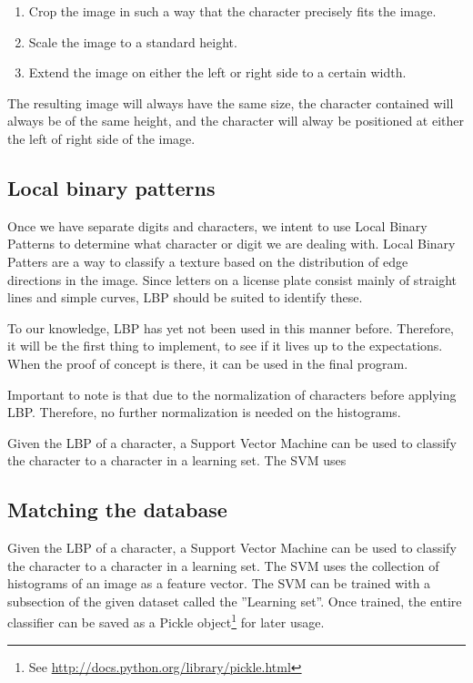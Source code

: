 \documentclass[a4paper]{article}
\begin{document}
\begin{enumerate}
    \item Crop the image in such a way that the character precisely fits the
          image.
    \item Scale the image to a standard height.
    \item Extend the image on either the left or right side to a certain width.
\end{enumerate}

The resulting image will always have the same size, the character contained
will always be of the same height, and the character will alway be positioned
at either the left of right side of the image.

\subsection{Local binary patterns}

Once we have separate digits and characters, we intent to use Local Binary
Patterns to determine what character or digit we are dealing with. Local Binary
Patters are a way to classify a texture based on the distribution of edge
directions in the image. Since letters on a license plate consist mainly of
straight lines and simple curves, LBP should be suited to identify these.

To our knowledge, LBP has yet not been used in this manner before. Therefore,
it will be the first thing to implement, to see if it lives up to the
expectations. When the proof of concept is there, it can be used in the final
program.

Important to note is that due to the normalization of characters before
applying LBP. Therefore, no further normalization is needed on the histograms.

Given the LBP of a character, a Support Vector Machine can be used to classify
the character to a character in a learning set. The SVM uses

\subsection{Matching the database}

Given the LBP of a character, a Support Vector Machine can be used to classify
the character to a character in a learning set. The SVM uses the collection of
histograms of an image as a feature vector.  The SVM can be trained with a
subsection of the given dataset called the ''Learning set''. Once trained, the
entire classifier can be saved as a Pickle object\footnote{See
\url{http://docs.python.org/library/pickle.html}} for later usage.
\end{document}
